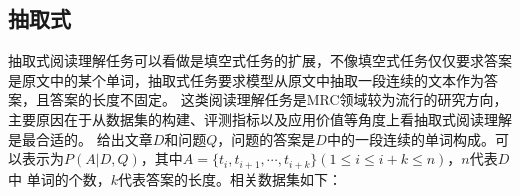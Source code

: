 %
%

\subsection{抽取式}
抽取式阅读理解任务可以看做是填空式任务的扩展，不像填空式任务仅仅要求答案是原文中的某个单词，抽取式任务要求模型从原文中抽取一段连续的文本作为答案，且答案的长度不固定。
这类阅读理解任务是MRC领域较为流行的研究方向，主要原因在于从数据集的构建、评测指标以及应用价值等角度上看抽取式阅读理解是最合适的。
给出文章$D$和问题$Q$，问题的答案是$D$中的一段连续的单词构成。可以表示为$P(A|D,Q)$，其中$A=\{t_i,t_{i+1},\cdots,t_{i+k}\}(1\leq i\leq i+k\leq n)$，$n$代表$D$中
单词的个数，$k$代表答案的长度。相关数据集如下：

